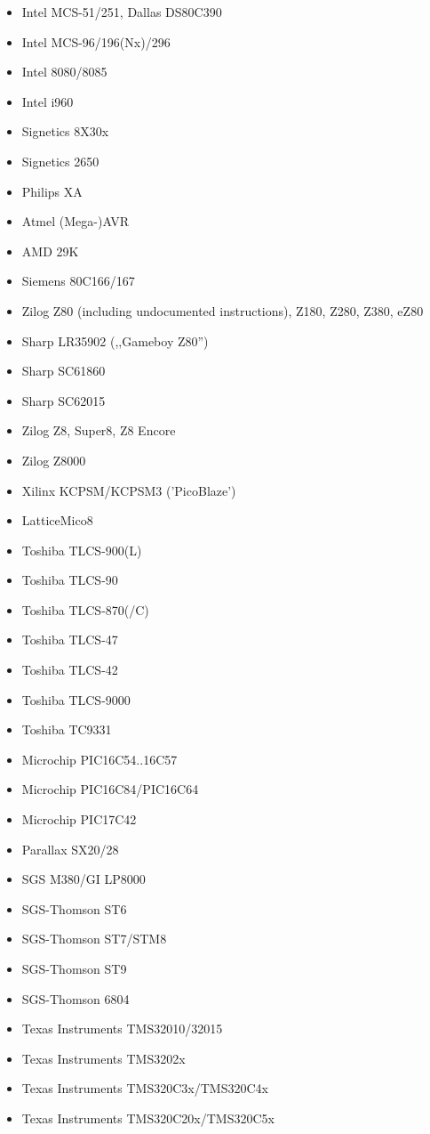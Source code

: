 \documentclass[12pt,twoside]{report}
\begin{document}
\begin{itemize}
{      variants}
\item{Intel MCS-51/251, Dallas DS80C390}
\item{Intel MCS-96/196(Nx)/296}
\item{Intel 8080/8085}
\item{Intel i960}
\item{Signetics 8X30x}
\item{Signetics 2650}
\item{Philips XA}
\item{Atmel (Mega-)AVR}
\item{AMD 29K}
\item{Siemens 80C166/167}
\item{Zilog Z80 (including undocumented instructions), Z180, Z280, Z380, eZ80}
\item{Sharp LR35902 (,,Gameboy Z80'')}
\item{Sharp SC61860}
\item{Sharp SC62015}
\item{Zilog Z8, Super8, Z8 Encore}
\item{Zilog Z8000}
\item{Xilinx KCPSM/KCPSM3 ('PicoBlaze')}
\item{LatticeMico8}
\item{Toshiba TLCS-900(L)}
\item{Toshiba TLCS-90}
\item{Toshiba TLCS-870(/C)}
\item{Toshiba TLCS-47}
\item{Toshiba TLCS-42}
\item{Toshiba TLCS-9000}
\item{Toshiba TC9331}
\item{Microchip PIC16C54..16C57}
\item{Microchip PIC16C84/PIC16C64}
\item{Microchip PIC17C42}
\item{Parallax SX20/28}
\item{SGS M380/GI LP8000}
\item{SGS-Thomson ST6}
\item{SGS-Thomson ST7/STM8}
\item{SGS-Thomson ST9}
\item{SGS-Thomson 6804}
\item{Texas Instruments TMS32010/32015}
\item{Texas Instruments TMS3202x}
\item{Texas Instruments TMS320C3x/TMS320C4x}
\item{Texas Instruments TMS320C20x/TMS320C5x}

\end{itemize}
\end{document}
